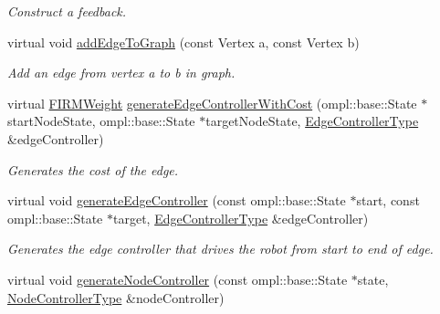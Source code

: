 \begin{DoxyCompactItemize}
\begin{DoxyCompactList}\small\item\em \-Construct a feedback. \end{DoxyCompactList}\item 
\hypertarget{class_f_i_r_m_af72f67131d7d663468bca975acf6530f}{virtual void \hyperlink{class_f_i_r_m_af72f67131d7d663468bca975acf6530f}{add\-Edge\-To\-Graph} (const \-Vertex a, const \-Vertex b)}\label{class_f_i_r_m_af72f67131d7d663468bca975acf6530f}

\begin{DoxyCompactList}\small\item\em \-Add an edge from vertex a to b in graph. \end{DoxyCompactList}\item 
\hypertarget{class_f_i_r_m_aaf77735db7879f41753c687eee488860}{virtual \hyperlink{class_f_i_r_m_weight}{\-F\-I\-R\-M\-Weight} \hyperlink{class_f_i_r_m_aaf77735db7879f41753c687eee488860}{generate\-Edge\-Controller\-With\-Cost} (ompl\-::base\-::\-State $\ast$start\-Node\-State, ompl\-::base\-::\-State $\ast$target\-Node\-State, \hyperlink{class_f_i_r_m_a70abcb24fbc9f836b94119f65c8f8a37}{\-Edge\-Controller\-Type} \&edge\-Controller)}\label{class_f_i_r_m_aaf77735db7879f41753c687eee488860}

\begin{DoxyCompactList}\small\item\em \-Generates the cost of the edge. \end{DoxyCompactList}\item 
\hypertarget{class_f_i_r_m_a776783fea0cacfa2d00f7b8876fe1679}{virtual void \hyperlink{class_f_i_r_m_a776783fea0cacfa2d00f7b8876fe1679}{generate\-Edge\-Controller} (const ompl\-::base\-::\-State $\ast$start, const ompl\-::base\-::\-State $\ast$target, \hyperlink{class_f_i_r_m_a70abcb24fbc9f836b94119f65c8f8a37}{\-Edge\-Controller\-Type} \&edge\-Controller)}\label{class_f_i_r_m_a776783fea0cacfa2d00f7b8876fe1679}

\begin{DoxyCompactList}\small\item\em \-Generates the edge controller that drives the robot from start to end of edge. \end{DoxyCompactList}\item 
\hypertarget{class_f_i_r_m_ace29a4cc91f7232235931fa4bded8809}{virtual void \hyperlink{class_f_i_r_m_ace29a4cc91f7232235931fa4bded8809}{generate\-Node\-Controller} (const ompl\-::base\-::\-State $\ast$state, \hyperlink{class_controller}{\-Node\-Controller\-Type} \&node\-Controller)}\label{class_f_i_r_m_ace29a4cc91f7232235931fa4bded8809}


\end{DoxyCompactItemize}
